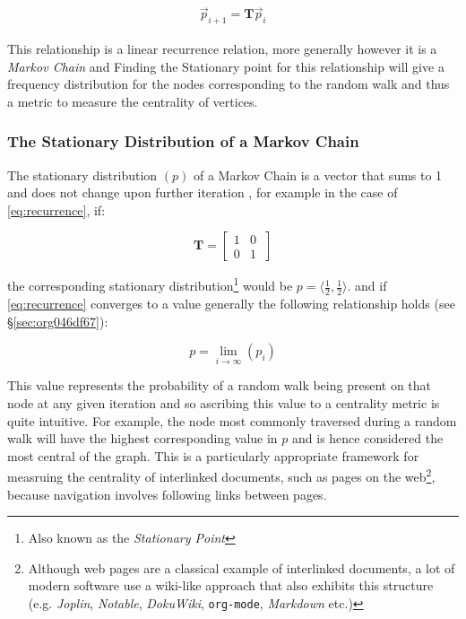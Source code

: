 \documentclass[11pt]{report}
\begin{document}
\begin{align}
\vec{p}_{i+1} = \mathbf{T}\vec{p}_{i} \label{eq:recurrence}
\end{align}

This relationship is a linear recurrence relation, more generally however it is
a \emph{Markov Chain} \cite[\S 4.4]{langvilleGooglePageRankScience2012} and
Finding the Stationary point for this relationship will give a frequency
distribution for the nodes corresponding to the random walk and thus a metric to
measure the centrality of vertices.

\subsubsection{The Stationary Distribution of a Markov Chain}
The stationary distribution \(\left(p\right)\) of a Markov Chain is a vector that sums to 1 and
does not change upon further iteration \cite[\S 1.1.7]{chingMarkovChainsModels2006}, for example in the case of \eqref{eq:recurrence}, if:

\[
  \mathbf{T} =
  \begin{bmatrix}
    1 & 0 \\
    0 & 1 \
  \end{bmatrix}
\]

the corresponding stationary distribution\footnote{Also
  known as the \textit{Stationary Point}} would be \(p = \langle \frac{1}{2}, \frac{1}{2} \rangle\).
and if \eqref{eq:recurrence} converges to a value generally the following relationship holds (see \S \ref{sec:org046df67}):

\[
  p = \lim_{i \rightarrow \infty} \left(p_{i}\right)
\]

This value represents the probability of a random walk being present on that
node at any given iteration and so ascribing this value to a centrality metric
is quite intuitive. For example, the node most commonly traversed during a random walk
will have the highest corresponding value in \(p\) and is hence considered the
most central of the graph. This is a particularly appropriate framework for
measruing the centrality of interlinked documents, such as pages on the
web\footnote{Although web pages are a classical example of interlinked
  documents, a lot of modern software use a wiki-like approach that also exhibits
  this structure (e.g. \textit{Joplin}, \textit{Notable}, \textit{DokuWiki},
  \texttt{org-mode}, \textit{Markdown} etc.) }, because navigation involves
following links between pages.
\end{document}
